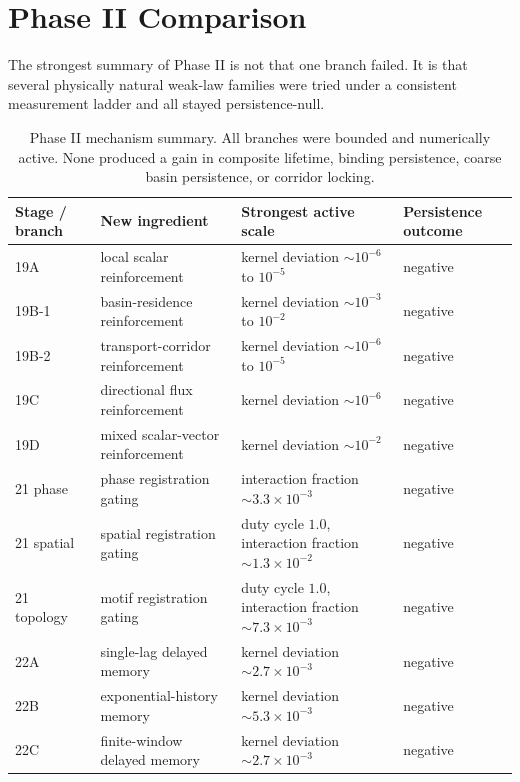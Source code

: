 \documentclass[11pt]{article}
\begin{document}
\section{Phase II Comparison}

The strongest summary of Phase II is not that one branch failed. It is that several physically natural weak-law families were tried under a consistent measurement ladder and all stayed persistence-null.

\begin{table}[h]
\centering
\small
\begin{tabular}{@{}p{1.6in}p{1.7in}p{1.6in}p{1.0in}@{}}
\toprule
Stage / branch & New ingredient & Strongest active scale & Persistence outcome \\
\midrule
19A & local scalar reinforcement & kernel deviation $\sim 10^{-6}$ to $10^{-5}$ & negative \\
19B-1 & basin-residence reinforcement & kernel deviation $\sim 10^{-3}$ to $10^{-2}$ & negative \\
19B-2 & transport-corridor reinforcement & kernel deviation $\sim 10^{-6}$ to $10^{-5}$ & negative \\
19C & directional flux reinforcement & kernel deviation $\sim 10^{-6}$ & negative \\
19D & mixed scalar-vector reinforcement & kernel deviation $\sim 10^{-2}$ & negative \\
21 phase & phase registration gating & interaction fraction $\sim 3.3\times10^{-3}$ & negative \\
21 spatial & spatial registration gating & duty cycle $1.0$, interaction fraction $\sim 1.3\times10^{-2}$ & negative \\
21 topology & motif registration gating & duty cycle $1.0$, interaction fraction $\sim 7.3\times10^{-3}$ & negative \\
22A & single-lag delayed memory & kernel deviation $\sim 2.7\times10^{-3}$ & negative \\
22B & exponential-history memory & kernel deviation $\sim 5.3\times10^{-3}$ & negative \\
22C & finite-window delayed memory & kernel deviation $\sim 2.7\times10^{-3}$ & negative \\
\bottomrule
\end{tabular}
\caption{Phase II mechanism summary. All branches were bounded and numerically active. None produced a gain in composite lifetime, binding persistence, coarse basin persistence, or corridor locking.}
\end{table}
\end{document}
